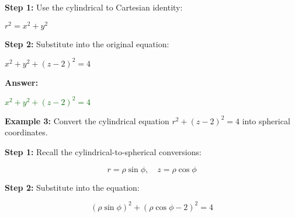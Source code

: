 \documentclass[10pt]{article}                               %
\begin{document}
\begin{adjustwidth}{2em}{0pt}
\begin{adjustwidth}{2em}{0pt}
\begin{examplebox}
\begin{adjustwidth}{2em}{0pt}
                \textbf{Step 1:} Use the cylindrical to Cartesian identity:
        
                \vspace{0.25em}
        
                \( r^2 = x^2 + y^2 \)
        
                \vspace{0.5em}
        
                \textbf{Step 2:} Substitute into the original equation:
        
                \vspace{0.25em}
        
                \( x^2 + y^2 + (z - 2)^2 = 4 \)
        
                \vspace{0.5em}
        
                \textbf{Answer:}
        
                \vspace{0.25em}
        
                \textcolor{darkgreen}{\( x^2 + y^2 + (z - 2)^2 = 4 \)}
        
            \end{adjustwidth}

            \textbf{Example 3:} Convert the cylindrical equation \( r^2 + (z - 2)^2 = 4 \) into spherical coordinates.
            \vspace{0.5em}

            \begin{adjustwidth}{2em}{0pt}
            
                \textbf{Step 1:} Recall the cylindrical-to-spherical conversions:
                \vspace{0.25em}
            
                \[
                r = \rho\sin\phi, \quad z = \rho\cos\phi
                \]
            
                \vspace{0.5em}
            
                \textbf{Step 2:} Substitute into the equation:
                \vspace{0.25em}
            
                \[
                (\rho\sin\phi)^2 + (\rho\cos\phi - 2)^2 = 4
                \]
            
                \vspace{0.5em}
            

\end{adjustwidth}
\end{examplebox}
\end{adjustwidth}
\end{adjustwidth}
\end{document}
